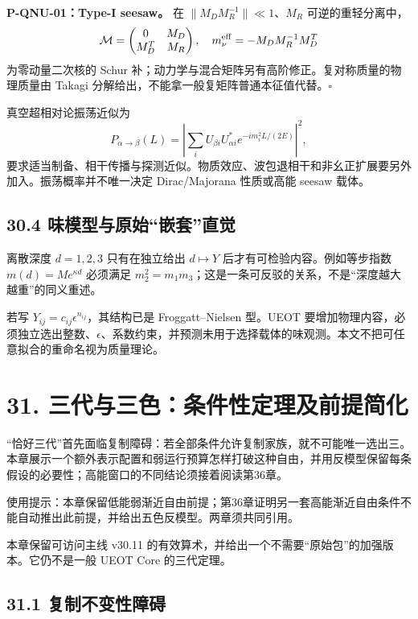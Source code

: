 \documentclass[
  11pt,
  oneside]{book}
\begin{document}
\protect\hypertarget{p-qnu-01}{}{}

\textbf{P-QNU-01：Type-I seesaw。} 在 \(\|M_D M_R^{-1}\|\ll1\)、\(M_R\)
可逆的重轻分离中， \[
\mathcal M=\begin{pmatrix}0&M_D\\M_D^T&M_R\end{pmatrix},
\quad m_\nu^{\rm eff}=-M_DM_R^{-1}M_D^T
\] 为零动量二次核的 Schur
补；动力学与混合矩阵另有高阶修正。复对称质量的物理质量由 Takagi
分解给出，不能拿一般复矩阵普通本征值代替。\(\square\)

真空超相对论振荡近似为 \[
P_{\alpha\to\beta}(L)=
\left|\sum_i U_{\beta i}U_{\alpha i}^*
e^{-im_i^2L/(2E)}\right|^2,
\]
要求适当制备、相干传播与探测近似。物质效应、波包退相干和非幺正扩展要另外加入。振荡概率并不唯一决定
Dirac/Majorana 性质或高能 seesaw 载体。

\section{30.4 味模型与原始``嵌套''直觉}

离散深度 \(d=1,2,3\) 只有在独立给出 \(d\mapsto Y\)
后才有可检验内容。例如等步指数 \(m(d)=Me^{\kappa d}\) 必须满足
\(m_2^2=m_1m_3\)；这是一条可反驳的关系，不是``深度越大越重''的同义重述。

若写 \(Y_{ij}=c_{ij}\epsilon^{n_{ij}}\)，其结构已是 Froggatt--Nielsen
型。UEOT
要增加物理内容，必须独立选出整数、\(\epsilon\)、系数约束，并预测未用于选择载体的味观测。本文不把可任意拟合的重命名视为质量理论。

\chapter{31. 三代与三色：条件性定理及前提简化}\label{ch-31}\hypertarget{ch-31}{}

``恰好三代''首先面临复制障碍：若全部条件允许复制家族，就不可能唯一选出三。本章展示一个额外表示配置和弱运行预算怎样打破这种自由，并用反模型保留每条假设的必要性；高能窗口的不同结论须接着阅读第36章。

使用提示：本章保留低能弱渐近自由前提；第36章证明另一套高能渐近自由条件不能自动推出此前提，并给出五色反模型。两章须共同引用。

本章保留可访问主线 v30.11
的有效算术，并给出一个不需要``原始包''的加强版本。它仍不是一般 UEOT Core
的三代定理。

\section{31.1 复制不变性障碍}
\end{document}
